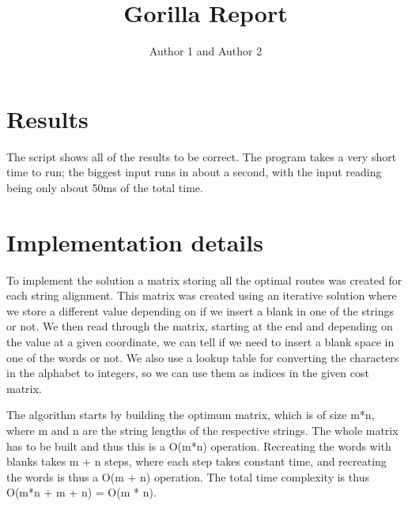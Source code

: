 \documentclass{article}
\title{Gorilla Report}
\author{Author 1 and Author 2}
\begin{document}
  \maketitle

  \section{Results}

The script shows all of the results to be correct. The program takes a very short time to run; the biggest input runs in about a second, with the input reading being only about 50ms of the total time.

  \section{Implementation details}

To implement the solution a matrix storing all the optimal routes was created for each string alignment. This matrix was created using an iterative solution where we store a different value depending on if we insert a blank in one of the strings or not. We then read through the matrix, starting at the end and depending on the value at a given coordinate, we can tell if we need to insert a blank space in one of the words or not. We also use a lookup table for converting the characters in the alphabet to integers, so we can use them as indices in the given cost matrix.

The algorithm starts by building the optimum matrix, which is of size m*n, where m and n are the string lengths of the respective strings. The whole matrix has to be built and thus this is a O(m*n) operation. Recreating the words with blanks takes m + n steps, where each step takes constant time, and recreating the words is thus a O(m + n) operation. The total time complexity is thus O(m*n + m + n) = O(m * n).
\end{document}
